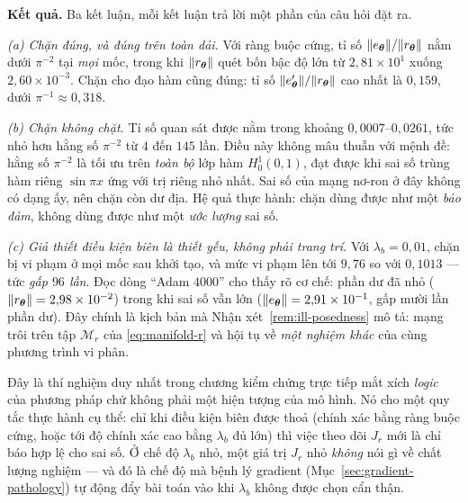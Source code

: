 \textbf{Kết quả.} Ba kết luận, mỗi kết luận trả lời một phần của câu hỏi đặt ra.

\emph{(a) Chặn đúng, và đúng trên toàn dải.} Với ràng buộc cứng, tỉ số
$\lVert e_{\bm{\theta}}\rVert/\lVert r_{\bm{\theta}}\rVert$ nằm dưới $\pi^{-2}$ tại \emph{mọi} mốc,
trong khi $\lVert r_{\bm{\theta}}\rVert$ quét bốn bậc độ lớn từ $2{,}81\times10^{1}$ xuống
$2{,}60\times10^{-3}$. Chặn cho đạo hàm cũng đúng: tỉ số
$\lVert e_{\bm{\theta}}'\rVert/\lVert r_{\bm{\theta}}\rVert$ cao nhất là $0{,}159$, dưới
$\pi^{-1}\approx 0{,}318$.

\emph{(b) Chặn không chặt.} Tỉ số quan sát được nằm trong khoảng
$0{,}0007$--$0{,}0261$, tức nhỏ hơn hằng số $\pi^{-2}$ từ $4$ đến $145$ lần. Điều
này không mâu thuẫn với mệnh đề: hằng số $\pi^{-2}$ là tối ưu trên \emph{toàn bộ}
lớp hàm $H^1_0(0,1)$, đạt được khi sai số trùng hàm riêng $\sin \pi x$ ứng với
trị riêng nhỏ nhất. Sai số của mạng nơ-ron ở đây không có dạng ấy, nên chặn còn
dư địa. Hệ quả thực hành: chặn dùng được như một \emph{bảo đảm}, không dùng được
như một \emph{ước lượng} sai số.

\emph{(c) Giả thiết điều kiện biên là thiết yếu, không phải trang trí.} Với
$\lambda_b = 0{,}01$, chặn bị vi phạm ở mọi mốc sau khởi tạo, và mức vi phạm lên
tới $9{,}76$ so với $0{,}1013$ --- tức \emph{gấp $96$ lần}. Đọc dòng
``Adam $4000$'' cho thấy rõ cơ chế: phần dư đã nhỏ
($\lVert r_{\bm{\theta}}\rVert = 2{,}98\times10^{-2}$) trong khi sai số vẫn lớn
($\lVert e_{\bm{\theta}}\rVert = 2{,}91\times10^{-1}$, gấp mười lần phần dư). Đây chính là
kịch bản mà Nhận xét~\ref{rem:ill-posedness} mô tả: mạng trôi trên tập
$\mathcal{M}_r$ của \eqref{eq:manifold-r} và hội tụ về \emph{một nghiệm khác} của
cùng phương trình vi phân.

\begin{nhanxet}
\label{nx:y-nghia-tn6}
Đây là thí nghiệm duy nhất trong chương kiểm chứng trực tiếp mắt xích
\emph{logic} của phương pháp chứ không phải một hiện tượng của mô hình. Nó cho
một quy tắc thực hành cụ thể: chỉ khi điều kiện biên được thoả (chính xác bằng
ràng buộc cứng, hoặc tới độ chính xác cao bằng $\lambda_b$ đủ lớn) thì việc theo
dõi $J_r$ mới là chỉ báo hợp lệ cho sai số. Ở chế độ $\lambda_b$ nhỏ, một giá trị
$J_r$ nhỏ \emph{không} nói gì về chất lượng nghiệm --- và đó là chế độ mà bệnh lý
gradient (Mục~\ref{sec:gradient-pathology}) tự động đẩy bài toán vào khi
$\lambda_b$ không được chọn cẩn thận.
\end{nhanxet}

